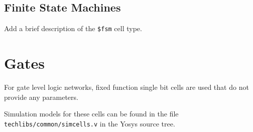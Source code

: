 \subsection{Finite State Machines}

\begin{fixme}
Add a brief description of the {\tt \$fsm} cell type.
\end{fixme}

\section{Gates}
\label{sec:celllib_gates}

For gate level logic networks, fixed function single bit cells are used that do
not provide any parameters.

Simulation models for these cells can be found in the file {\tt techlibs/common/simcells.v} in the Yosys
source tree.

